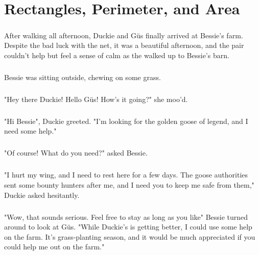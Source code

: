  \chapter{Rectangles, Perimeter, and Area}
 \paragraph{} After walking all afternoon, Duckie and Güs finally arrived at Bessie's farm. Despite the bad luck with the net, it was a beautiful afternoon, and the pair couldn't help but feel a sense of calm as the walked up to Bessie's barn.
 \paragraph{} Bessie was sitting outside, chewing on some grass.
 \paragraph{} "Hey there Duckie! Hello Güs! How's it going?" she moo'd.
 \paragraph{} "Hi Bessie", Duckie greeted. "I'm looking for the golden goose of legend, and I need some help."
 \paragraph{} "Of course! What do you need?" asked Bessie.
 \paragraph{} "I hurt my wing, and I need to rest here for a few days. The goose authorities sent some bounty hunters after me, and I need you to keep me safe from them," Duckie asked hesitantly.
 \paragraph{} "Wow, that sounds serious. Feel free to stay as long as you like" Bessie turned around to look at Güs. "While Duckie's is getting better, I could use some help on the farm. It's grass-planting season, and it would be much appreciated if you could help me out on the farm."
